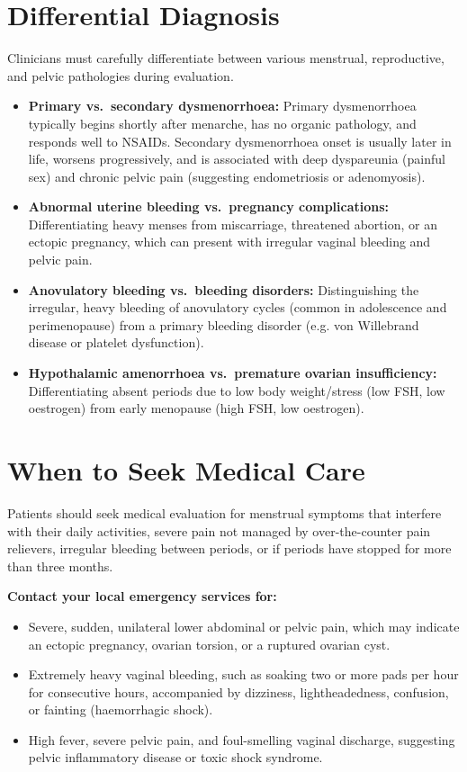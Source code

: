 \section*{Differential Diagnosis}
Clinicians must carefully differentiate between various menstrual, reproductive, and pelvic pathologies during evaluation.
\begin{itemize}
    \item \textbf{Primary vs.\ secondary dysmenorrhoea:} Primary dysmenorrhoea typically begins shortly after menarche, has no organic pathology, and responds well to NSAIDs. Secondary dysmenorrhoea onset is usually later in life, worsens progressively, and is associated with deep dyspareunia (painful sex) and chronic pelvic pain (suggesting endometriosis or adenomyosis).
    \item \textbf{Abnormal uterine bleeding vs.\ pregnancy complications:} Differentiating heavy menses from miscarriage, threatened abortion, or an ectopic pregnancy, which can present with irregular vaginal bleeding and pelvic pain.
    \item \textbf{Anovulatory bleeding vs.\ bleeding disorders:} Distinguishing the irregular, heavy bleeding of anovulatory cycles (common in adolescence and perimenopause) from a primary bleeding disorder (e.g. von Willebrand disease or platelet dysfunction).
    \item \textbf{Hypothalamic amenorrhoea vs.\ premature ovarian insufficiency:} Differentiating absent periods due to low body weight/stress (low FSH, low oestrogen) from early menopause (high FSH, low oestrogen).
\end{itemize}

\section*{When to Seek Medical Care}
Patients should seek medical evaluation for menstrual symptoms that interfere with their daily activities, severe pain not managed by over-the-counter pain relievers, irregular bleeding between periods, or if periods have stopped for more than three months.

\textbf{Contact your local emergency services for:}
\begin{itemize}
    \item Severe, sudden, unilateral lower abdominal or pelvic pain, which may indicate an ectopic pregnancy, ovarian torsion, or a ruptured ovarian cyst.
    \item Extremely heavy vaginal bleeding, such as soaking two or more pads per hour for consecutive hours, accompanied by dizziness, lightheadedness, confusion, or fainting (haemorrhagic shock).
    \item High fever, severe pelvic pain, and foul-smelling vaginal discharge, suggesting pelvic inflammatory disease or toxic shock syndrome.
\end{itemize}

